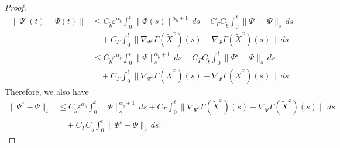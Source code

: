 \documentclass[11pt]{article}
\theoremstyle{definition}
\theoremstyle{plain}
\newcommand{\tb}{\tilde{b}}
\newcommand{\veps}{\varepsilon}
\begin{document}
\begin{appendices}
\begin{proof}
\begin{align*}
\| \Psi^\varepsilon(t) - \Psi(t) \| &\le C_{\tb}\veps^{\alpha_{\tb}} \int_0^t \| \Phi(s) \|^{{\alpha_{\tb}}+1}\,ds
+ C_\Gamma C_{\tb} \int_0^t \| \Psi^\varepsilon - \Psi \|_s\,ds \\
&\quad + C_\Gamma \int_0^t \| \nabla_{\Psi^\varepsilon} \Gamma(\tilde{X}^x)(s) - \nabla_{\Psi} \Gamma(\tilde{X}^x)(s) \|\,ds \\
&\le C_{\tb}\veps^{\alpha_{\tb}} \int_0^t \| \Phi \|_s^{{\alpha_{\tb}}+1}\,ds
+ C_\Gamma C_{\tb} \int_0^t \| \Psi^\varepsilon - \Psi \|_s\,ds \\
&\quad + C_\Gamma \int_0^t \| \nabla_{\Psi^\varepsilon} \Gamma(\tilde{X}^x)(s) - \nabla_{\Psi} \Gamma(\tilde{X}^x)(s) \|\,ds.
\end{align*}
Therefore, we also have
\begin{align*}
\| \Psi^\varepsilon - \Psi \|_t 
&\le C_{\tb}\veps^{\alpha_{\tb}} \int_0^t \| \Phi \|_s^{{\alpha_{\tb}}+1}\,ds + C_\Gamma \int_0^t \| \nabla_{\Psi^\varepsilon} \Gamma(\tilde{X}^x)(s) - \nabla_{\Psi} \Gamma(\tilde{X}^x)(s) \|\,ds \\
&\quad + C_\Gamma C_{\tb} \int_0^t \| \Psi^\varepsilon - \Psi \|_s\,ds. 
\end{align*}


\end{proof}
\end{appendices}
\end{document}
